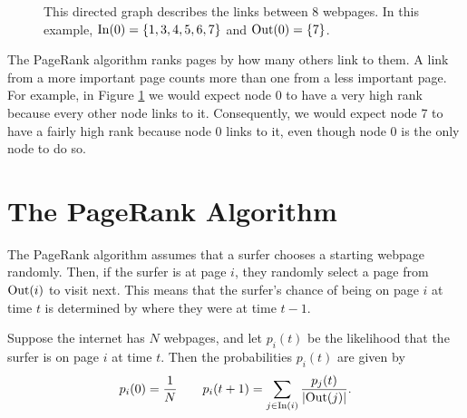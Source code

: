 \begin{figure}
\centering
{}

\caption{This directed graph describes the links between 8 webpages. In this example, $\operatorname{In}(0)=\{1,3,4,5,6,7\}$ and $\operatorname{Out}(0)=\{7\}$.}
\label{fig:network1}
\end{figure}

The PageRank algorithm ranks pages by how many others link to them.
A link from a more important page counts more than one from a less important page.
For example, in Figure \ref{fig:network1} we would expect node 0 to have a very high rank because every other node links to it.
Consequently, we would expect node 7 to have a fairly high rank because node 0 links to it, even though node 0 is the only node to do so.

\section*{The PageRank Algorithm}
The PageRank algorithm assumes that a surfer chooses a starting webpage randomly.
Then, if the surfer is at page $i$, they randomly select a page from $\operatorname{Out}(i)$ to visit next.
This means that the surfer's chance of being on page $i$ at time $t$ is determined by where they were at time $t-1$.

Suppose the internet has $N$ webpages, and let $p_i(t)$ be the likelihood that the surfer is on page $i$ at time $t$.
Then the probabilities $p_i(t)$ are given by
\begin{equation}\label{equ:pr1}
p_i(0)=\frac{1}{N} \qquad p_i(t+1) = \sum_{j \in \operatorname{In}(i)} \frac{p_j(t)}{\left\lvert\operatorname{Out}(j)\right\rvert}.
\end{equation}

